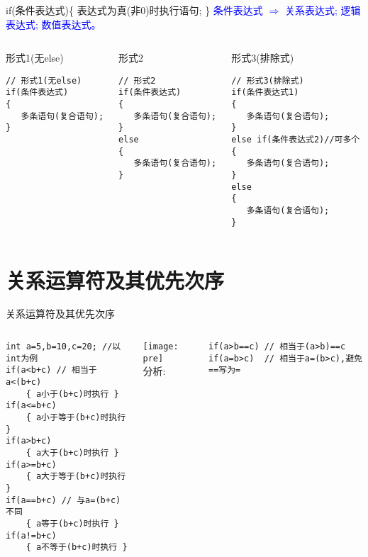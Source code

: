 \begin{frame}{if(条件表达式)\{ 表达式为真(非0)时执行语句; \}}
\textcolor{blue}{条件表达式 $\Rightarrow$ 关系表达式; 逻辑表达式; 数值表达式。}
\begin{columns}[t]
\begin{beamerboxesrounded}{形式1(无else)}
\begin{lstlisting}
// 形式1(无else)
if(条件表达式)
{
   多条语句(复合语句);
}
\end{lstlisting}
\end{beamerboxesrounded}
\begin{beamerboxesrounded}{形式2}
\begin{lstlisting}
// 形式2
if(条件表达式)
{
   多条语句(复合语句);
}
else
{
   多条语句(复合语句);
}
\end{lstlisting} 
\end{beamerboxesrounded}
\begin{beamerboxesrounded}{形式3(排除式)}
\begin{lstlisting}
// 形式3(排除式)
if(条件表达式1)
{
   多条语句(复合语句);
}
else if(条件表达式2)//可多个
{
   多条语句(复合语句);
}
else
{
   多条语句(复合语句);
}
\end{lstlisting}
\end{beamerboxesrounded}
\end{columns}                        
\end{frame}

\section{关系运算符及其优先次序}

\begin{frame}{关系运算符及其优先次序}
\begin{columns}%
\begin{lstlisting}
int a=5,b=10,c=20; //以int为例
if(a<b+c) // 相当于a<(b+c)
	{ a小于(b+c)时执行 }
if(a<=b+c) 
	{ a小于等于(b+c)时执行 }
if(a>b+c) 
	{ a大于(b+c)时执行 }
if(a>=b+c) 
	{ a大于等于(b+c)时执行 }
if(a==b+c) // 与a=(b+c)不同
	{ a等于(b+c)时执行 }
if(a!=b+c) 
	{ a不等于(b+c)时执行 }
\end{lstlisting}
\texttt{[image: pre]}\\
分析:
\begin{lstlisting}
if(a>b==c) // 相当于(a>b)==c
if(a=b>c)  // 相当于a=(b>c),避免==写为=
\end{lstlisting}
\end{columns}
\end{frame}

